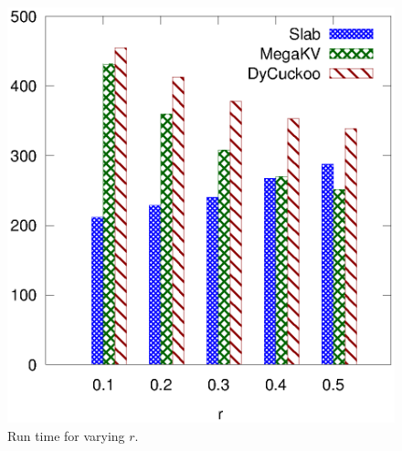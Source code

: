\begin{figure}[htp]
\begin{minipage}{0.19\linewidth}
		\centerline{\dsali}
	\end{minipage}
	\begin{minipage}{0.19\linewidth}\centering
		\includegraphics[width=\linewidth]{pic/dynamic/r/dynamic_random.eps}
		\centerline{\dsrandom}
	\end{minipage}
	\caption{Run time for varying $r$.}
	\label{fig:vary-r-time}
\end{figure}
%
